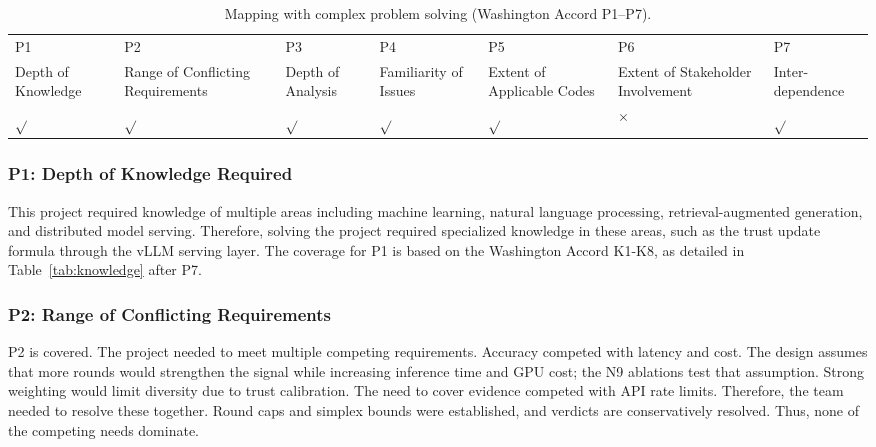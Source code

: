 \begin{center}
    \begin{table}[ht]
        \centering
        \caption{Mapping with complex problem solving (Washington Accord P1--P7).}
        \renewcommand{\arraystretch}{1.4}
        \scriptsize
        \begin{tabular}{|p{}|p{}|p{}|p{}|p{}|p{}|p{}|}
            \hline
            P1                 & P2                                & P3                & P4                    & P5                         & P6                                & P7               \\
            Depth of Knowledge & Range of Conflicting Requirements & Depth of Analysis & Familiarity of Issues & Extent of Applicable Codes & Extent of Stakeholder Involvement & Inter-dependence \\
            \hline
            $\sqrt{}$          & $\sqrt{}$                         & $\sqrt{}$         & $\sqrt{}$             & $\sqrt{}$                  & $\times$                          & $\sqrt{}$        \\
            \hline
        \end{tabular}
        \label{tab:p_solve}
    \end{table}
\end{center}

\subsubsection{P1: Depth of Knowledge Required}

This project required knowledge of multiple areas including machine learning, natural language processing, retrieval-augmented generation, and distributed model serving. Therefore, solving the project required specialized knowledge in these areas, such as the trust update formula through the vLLM serving layer. The coverage for P1 is based on the Washington Accord K1-K8, as detailed in Table~\ref{tab:knowledge} after P7.

\subsubsection{P2: Range of Conflicting Requirements}

P2 is covered. The project needed to meet multiple competing requirements. Accuracy competed with latency and cost. The design assumes that more rounds would strengthen the signal while increasing inference time and GPU cost; the N9 ablations test that assumption. Strong weighting would limit diversity due to trust calibration. The need to cover evidence competed with API rate limits. Therefore, the team needed to resolve these together. Round caps and simplex bounds were established, and verdicts are conservatively resolved. Thus, none of the competing needs dominate.

